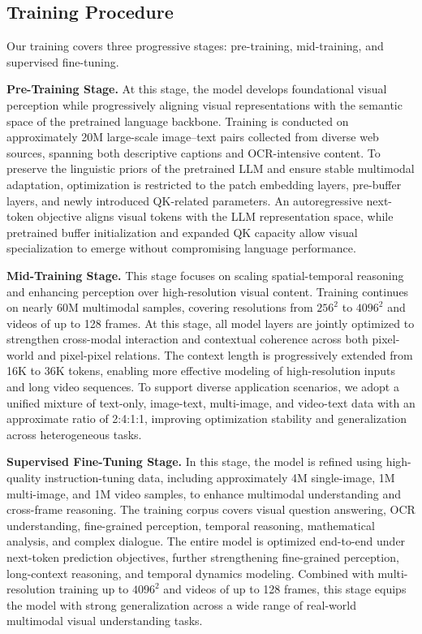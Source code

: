 \documentclass{llmxive}
\begin{document}
\subsection{Training Procedure}
Our training covers three progressive stages: pre-training, mid-training, and supervised fine-tuning.

\textbf{Pre-Training Stage.}
At this stage, the model develops foundational visual perception while progressively aligning visual representations with the semantic space of the pretrained language backbone. Training is conducted on approximately 20M large-scale image–text pairs collected from diverse web sources, spanning both descriptive captions and OCR-intensive content.
%
To preserve the linguistic priors of the pretrained LLM and ensure stable multimodal adaptation, optimization is restricted to the patch embedding layers, pre-buffer layers, and newly introduced QK-related parameters. An autoregressive next-token objective aligns visual tokens with the LLM representation space, while pretrained buffer initialization and expanded QK capacity allow visual specialization to emerge without compromising language performance.


\textbf{Mid-Training Stage.}
This stage focuses on scaling spatial-temporal reasoning and enhancing perception over high-resolution visual content. Training continues on nearly 60M multimodal samples, covering resolutions from $256^2$ to $4096^2$ and videos of up to 128 frames.
%
At this stage, all model layers are jointly optimized to strengthen cross-modal interaction and contextual coherence across both pixel-world and pixel-pixel relations. The context length is progressively extended from 16K to 36K tokens, enabling more effective modeling of high-resolution inputs and long video sequences. To support diverse application scenarios, we adopt a unified mixture of text-only, image-text, multi-image, and video-text data with an approximate ratio of 2:4:1:1, improving optimization stability and generalization across heterogeneous tasks.


\textbf{Supervised Fine-Tuning Stage.}
In this stage, the model is refined using high-quality instruction-tuning data, including approximately 4M single-image, 1M multi-image, and 1M video samples, to enhance multimodal understanding and cross-frame reasoning. The training corpus covers visual question answering, OCR understanding, fine-grained perception, temporal reasoning, mathematical analysis, and complex dialogue.
%
The entire model is optimized end-to-end under next-token prediction objectives, further strengthening fine-grained perception, long-context reasoning, and temporal dynamics modeling. Combined with multi-resolution training up to $4096^2$ and videos of up to 128 frames, this stage equips the model with strong generalization across a wide range of real-world multimodal visual understanding tasks.
\end{document}
